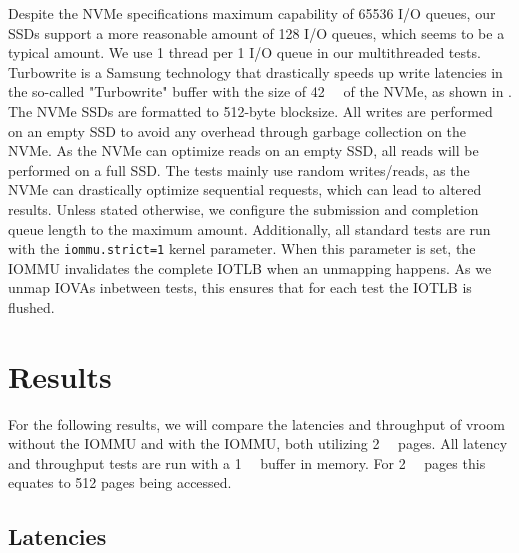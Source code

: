 Despite the NVMe specifications maximum capability of 65536 I/O queues, our SSDs support a more reasonable amount of 128 I/O queues, which seems to be a typical amount.
We use 1 thread per 1 I/O queue in our multithreaded tests. Turbowrite is a Samsung technology that drastically speeds up write latencies in the so-called "Turbowrite" buffer with the size of \qty{42}{\giga\byte} of the NVMe, as shown in \cite{vroom}.
The NVMe SSDs are formatted to 512-byte blocksize. All writes are performed on an empty SSD to avoid any overhead through garbage collection on the NVMe. As the NVMe can optimize reads on an empty SSD, all reads will be performed on a full SSD. The tests mainly use random writes/reads, as the NVMe can drastically optimize sequential requests, which can lead to altered results.
Unless stated otherwise, we configure the submission and completion queue length to the maximum amount.
Additionally, all standard tests are run with the \texttt{iommu.strict=1} kernel parameter. When this parameter is set, the IOMMU invalidates the complete IOTLB when an unmapping happens. As we unmap IOVAs inbetween tests, this ensures that for each test the IOTLB is flushed.

\section{Results}
For the following results, we will compare the latencies and throughput of vroom without the IOMMU and with the IOMMU, both utilizing \qty{2}{\mebi\byte} pages. All latency and throughput tests are run with a \qty{1}{\gibi\byte} buffer in memory. For \qty{2}{\mebi\byte} pages this equates to 512 pages being accessed.

\subsection{Latencies}


